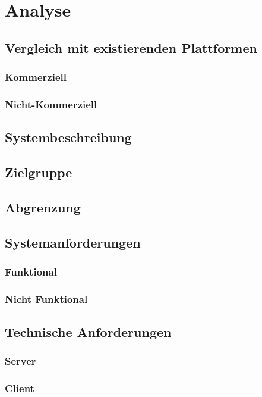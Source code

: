 \section{Analyse}\label{sec:analyse}
\subsection{Vergleich mit existierenden Plattformen}\label{sec:vergleichplat}
\subsubsection{Kommerziell}\label{sec:vergleichkommerz}
\subsubsection{Nicht-Kommerziell}\label{sec:vergleichnonkommerz}
\subsection{Systembeschreibung}\label{sec:sysbeschreib}
\subsection{Zielgruppe}\label{sec:zielgruppe}
\subsection{Abgrenzung}\label{sec:abgrenz}
\subsection{Systemanforderungen}\label{sec:anforderung}
\subsubsection{Funktional}\label{sec:anffunc}
\subsubsection{Nicht Funktional}\label{sec:nichtfunc}
\subsection{Technische Anforderungen}\label{sec:techanford}
\subsubsection{Server}\label{sec:servertech}
\subsubsection{Client}\label{sec:clienttech}

